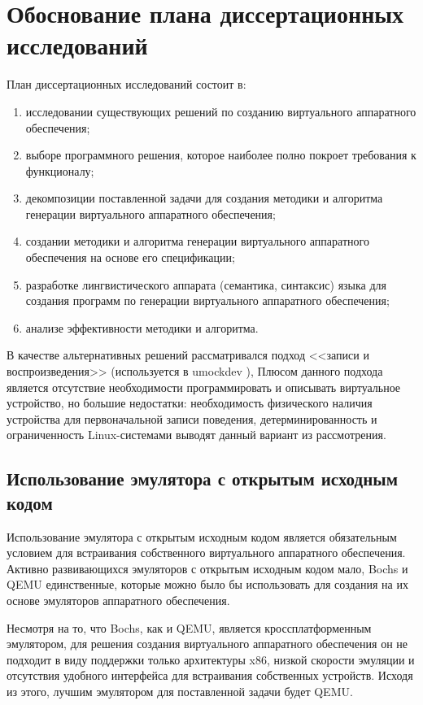 \section{Обоснование плана диссертационных исследований}\label{sec:ch1/sec3}

План диссертационных исследований состоит в:

\begin{enumerate}[label={\arabic*)}]
    \item исследовании существующих решений по созданию виртуального аппаратного обеспечения;
    \item выборе программного решения, которое наиболее полно покроет требования к функционалу;
    \item декомпозиции поставленной задачи для создания методики и алгоритма генерации виртуального аппаратного обеспечения;
    \item создании методики и алгоритма генерации виртуального аппаратного обеспечения на основе его спецификации;
    \item разработке лингвистического аппарата (семантика, синтаксис) языка для создания программ по генерации виртуального
        аппаратного обеспечения;
    \item анализе эффективности методики и алгоритма.
\end{enumerate}

В качестве альтернативных решений рассматривался подход <<записи и воспроизведения>> (используется в umockdev \cite{umockdev}),
Плюсом данного подхода является отсутствие необходимости программировать и описывать виртуальное устройство,
но большие недостатки: необходимость физического наличия устройства для первоначальной записи
поведения, детерминированность и ограниченность Linux-системами выводят данный вариант из рассмотрения.

\subsection*{Использование эмулятора с открытым исходным кодом}\label{sec:ch1/sec4/sub1}

Использование эмулятора с открытым исходным кодом является обязательным
условием для встраивания собственного виртуального аппаратного обеспечения.
Активно развивающихся эмуляторов с открытым исходным кодом мало, Bochs \cite{bochs} и QEMU
единственные, которые можно было бы использовать для создания на их основе
эмуляторов аппаратного обеспечения.

Несмотря на то, что Bochs, как и QEMU, является кроссплатформенным эмулятором,
для решения создания виртуального аппаратного обеспечения
он не подходит в виду поддержки только архитектуры x86, низкой скорости эмуляции
и отсутствия удобного интерфейса для встраивания собственных устройств.
Исходя из этого, лучшим эмулятором для поставленной задачи будет QEMU.

